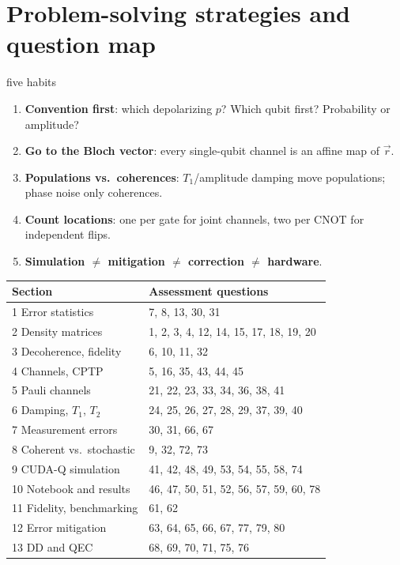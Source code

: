 \documentclass[11pt,a4paper,openany]{book}
\begin{document}
\section{Problem-solving strategies and question map}
\begin{method}{five habits}
\begin{enumerate}[itemsep=1pt]
\item \textbf{Convention first}: which depolarizing $p$? Which qubit first? Probability or amplitude?
\item \textbf{Go to the Bloch vector}: every single-qubit channel is an affine map of $\vec r$.
\item \textbf{Populations vs.\ coherences}: $T_1$/amplitude damping move populations; phase noise only coherences.
\item \textbf{Count locations}: one per gate for joint channels, two per CNOT for independent flips.
\item \textbf{Simulation $\neq$ mitigation $\neq$ correction $\neq$ hardware}.
\end{enumerate}
\end{method}
\begin{center}\small
\begin{tabularx}{\linewidth}{@{}lX@{}}
\toprule Section & Assessment questions\\ \midrule
1 Error statistics & 7, 8, 13, 30, 31\\
2 Density matrices & 1, 2, 3, 4, 12, 14, 15, 17, 18, 19, 20\\
3 Decoherence, fidelity & 6, 10, 11, 32\\
4 Channels, CPTP & 5, 16, 35, 43, 44, 45\\
5 Pauli channels & 21, 22, 23, 33, 34, 36, 38, 41\\
6 Damping, $T_1$, $T_2$ & 24, 25, 26, 27, 28, 29, 37, 39, 40\\
7 Measurement errors & 30, 31, 66, 67\\
8 Coherent vs.\ stochastic & 9, 32, 72, 73\\
9 CUDA-Q simulation & 41, 42, 48, 49, 53, 54, 55, 58, 74\\
10 Notebook and results & 46, 47, 50, 51, 52, 56, 57, 59, 60, 78\\
11 Fidelity, benchmarking & 61, 62\\
12 Error mitigation & 63, 64, 65, 66, 67, 77, 79, 80\\
13 DD and QEC & 68, 69, 70, 71, 75, 76\\ \bottomrule
\end{tabularx}
\end{center}
\end{document}
